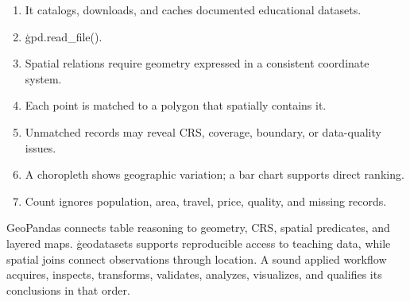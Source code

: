 \begin{enumerate}
    \item It catalogs, downloads, and caches documented educational datasets.
    \item \c{gpd.read_file()}.
    \item Spatial relations require geometry expressed in a consistent coordinate system.
    \item Each point is matched to a polygon that spatially contains it.
    \item Unmatched records may reveal CRS, coverage, boundary, or data-quality issues.
    \item A choropleth shows geographic variation; a bar chart supports direct ranking.
    \item Count ignores population, area, travel, price, quality, and missing records.
\end{enumerate}

\begin{tcolorbox}[title=Part V summary,colframe=orange,colback=white,arc=2mm]
GeoPandas connects table reasoning to geometry, CRS, spatial predicates, and
layered maps. \c{geodatasets} supports reproducible access to teaching data,
while spatial joins connect observations through location. A sound applied
workflow acquires, inspects, transforms, validates, analyzes, visualizes, and
qualifies its conclusions in that order.
\end{tcolorbox}
